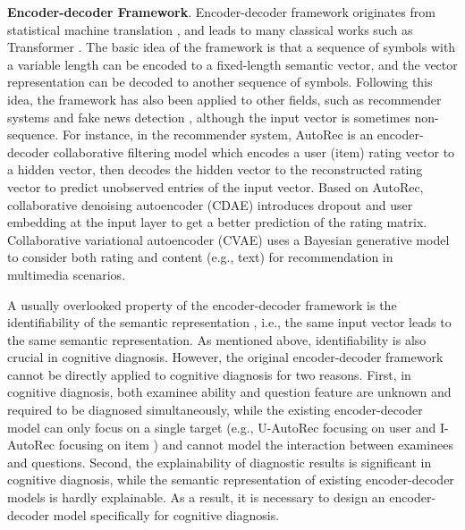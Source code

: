 \documentclass[sigconf]{acmart}
\begin{document}
\par \textbf{Encoder-decoder Framework}. Encoder-decoder framework originates from statistical machine translation \cite{ChoMGBBSB2014}, and leads to many classical works such as Transformer \cite{Vaswani2017}. The basic idea of the framework is that a sequence of symbols with a variable length can be encoded to a fixed-length semantic vector, and the vector representation can be decoded to another sequence of symbols. Following this idea, the framework has also been applied to other fields, such as recommender systems \cite{Sedhain2015,WuDZE2016,Kang2021,Li2017} and fake news detection \cite{WuRZZN2023,RazaD2022,nan2021mdfend}, although the input vector is sometimes non-sequence. For instance, in the recommender system, AutoRec \cite{Sedhain2015} is an encoder-decoder collaborative filtering model which encodes a user (item) rating vector to a hidden vector, then decodes the hidden vector to the reconstructed rating vector to predict unobserved entries of the input vector. Based on AutoRec, collaborative denoising autoencoder (CDAE) \cite{WuDZE2016} introduces dropout \cite{SrivastavaHKSS2014} and user embedding at the input layer to get a better prediction of the rating matrix. Collaborative variational autoencoder (CVAE) \cite{Li2017} uses a Bayesian generative model to consider both rating and content (e.g., text) for recommendation in multimedia scenarios.
\par A usually overlooked property of the encoder-decoder framework is the identifiability of the semantic representation \cite{DideriksenDT2022}, i.e., the same input vector leads to the same semantic representation. As mentioned above, identifiability is also crucial in cognitive diagnosis. However, the original encoder-decoder framework cannot be directly applied to cognitive diagnosis for two reasons. First, in cognitive diagnosis, both examinee ability and question feature are unknown and required to be diagnosed simultaneously, while the existing encoder-decoder model can only focus on a single target (e.g., U-AutoRec focusing on user and I-AutoRec focusing on item \cite{Sedhain2015}) and cannot model the interaction between examinees and questions. Second, the explainability of diagnostic results is significant in cognitive diagnosis, while the semantic representation of existing encoder-decoder models is hardly explainable. As a result, it is necessary to design an encoder-decoder model specifically for cognitive diagnosis.


\vspace{-5pt}
\end{document}
